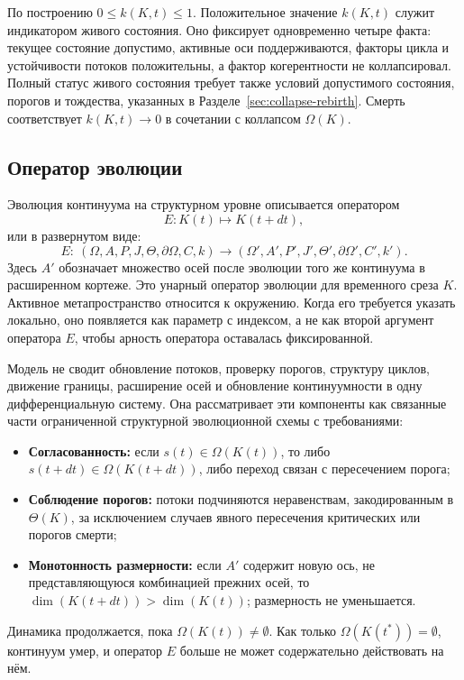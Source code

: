По построению \(0 \le k(K,t) \le 1\).
Положительное значение \(k(K,t)\) служит индикатором живого состояния.
Оно фиксирует одновременно четыре факта: текущее состояние допустимо,
активные оси поддерживаются, факторы цикла и устойчивости потоков положительны,
а фактор когерентности не коллапсировал. Полный статус живого состояния
требует также условий допустимого состояния, порогов и тождества,
указанных в Разделе~\ref{sec:collapse-rebirth}.
Смерть соответствует \(k(K,t)\to 0\) в сочетании с коллапсом \(\Omega(K)\).

\subsection{Оператор эволюции}

Эволюция континуума на структурном уровне описывается оператором
\[
    E: K(t) \mapsto K(t+dt),
\]
или в развернутом виде:
\[
    E:\ (\Omega,A,P,J,\Theta,\partial\Omega,C,k)
    \longrightarrow (\Omega',A',P',J',\Theta',\partial\Omega',C',k').
\]
Здесь \(A'\) обозначает множество осей после эволюции того же континуума в расширенном кортеже.
Это унарный оператор эволюции для временного среза \(K\).
Активное метапространство относится к окружению. Когда его требуется указать локально,
оно появляется как параметр с индексом, а не как второй аргумент оператора \(E\),
чтобы арность оператора оставалась фиксированной.

Модель не сводит обновление потоков, проверку порогов, структуру циклов,
движение границы, расширение осей и обновление континуумности в одну
дифференциальную систему. Она рассматривает эти компоненты как связанные части
ограниченной структурной эволюционной схемы с требованиями:

\begin{itemize}
    \item \textbf{Согласованность:} если \(s(t) \in \Omega(K(t))\), то либо
          \(s(t+dt) \in \Omega(K(t+dt))\), либо переход связан с пересечением порога;
    \item \textbf{Соблюдение порогов:} потоки подчиняются неравенствам, закодированным в \(\Theta(K)\),
          за исключением случаев явного пересечения критических или порогов смерти;
    \item \textbf{Монотонность размерности:} если \(A'\) содержит новую ось, не представляющуюся
          комбинацией прежних осей, то \(\dim(K(t+dt)) > \dim(K(t))\); размерность не уменьшается.
\end{itemize}

Динамика продолжается, пока \(\Omega(K(t)) \neq \emptyset\).
Как только \(\Omega(K(t^\ast)) = \emptyset\), континуум умер, и оператор \(E\)
больше не может содержательно действовать на нём.

